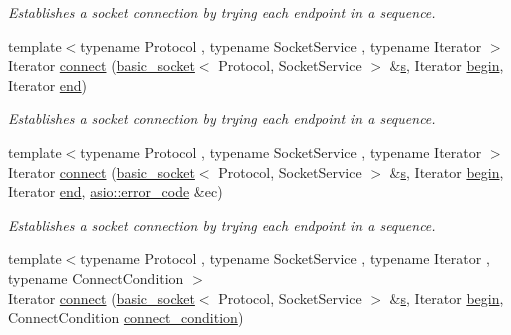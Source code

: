 \begin{DoxyCompactItemize}
\begin{DoxyCompactList}\small\item\em Establishes a socket connection by trying each endpoint in a sequence. \end{DoxyCompactList}\item 
{\footnotesize template$<$typename Protocol , typename Socket\+Service , typename Iterator $>$ }\\Iterator \hyperlink{group__connect_ga8617a800bbe4f0e99be3826d8e48e60e}{connect} (\hyperlink{classasio_1_1basic__socket}{basic\+\_\+socket}$<$ Protocol, Socket\+Service $>$ \&\hyperlink{group__async__connect_ga31ab74b9ea6c77932dddd016cfc7920a}{s}, Iterator \hyperlink{group__async__connect_ga7055bca9225050c030c19c7dc926fa53}{begin}, Iterator \hyperlink{group__async__connect_gadb6ad0193229ae84828688e812cd325c}{end})
\begin{DoxyCompactList}\small\item\em Establishes a socket connection by trying each endpoint in a sequence. \end{DoxyCompactList}\item 
{\footnotesize template$<$typename Protocol , typename Socket\+Service , typename Iterator $>$ }\\Iterator \hyperlink{group__connect_ga6cc8005658c5ece3566508bc108d4c83}{connect} (\hyperlink{classasio_1_1basic__socket}{basic\+\_\+socket}$<$ Protocol, Socket\+Service $>$ \&\hyperlink{group__async__connect_ga31ab74b9ea6c77932dddd016cfc7920a}{s}, Iterator \hyperlink{group__async__connect_ga7055bca9225050c030c19c7dc926fa53}{begin}, Iterator \hyperlink{group__async__connect_gadb6ad0193229ae84828688e812cd325c}{end}, \hyperlink{classasio_1_1error__code}{asio\+::error\+\_\+code} \&ec)
\begin{DoxyCompactList}\small\item\em Establishes a socket connection by trying each endpoint in a sequence. \end{DoxyCompactList}\item 
{\footnotesize template$<$typename Protocol , typename Socket\+Service , typename Iterator , typename Connect\+Condition $>$ }\\Iterator \hyperlink{group__connect_ga9a192c653d045eaa7c8c7817316a52b5}{connect} (\hyperlink{classasio_1_1basic__socket}{basic\+\_\+socket}$<$ Protocol, Socket\+Service $>$ \&\hyperlink{group__async__connect_ga31ab74b9ea6c77932dddd016cfc7920a}{s}, Iterator \hyperlink{group__async__connect_ga7055bca9225050c030c19c7dc926fa53}{begin}, Connect\+Condition \hyperlink{group__async__connect_ga47e3dda205dfba3553f4c7e005897687}{connect\+\_\+condition})

\end{DoxyCompactItemize}
